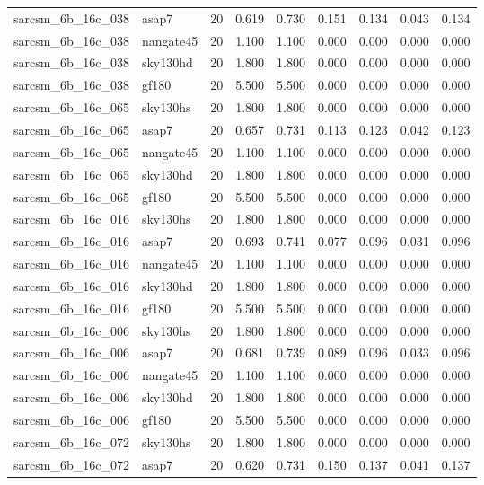 \begin{tabular}{llrrrrrrr}
sarcsm\_6b\_16c\_038 & asap7 & 20 & 0.619 & 0.730 & 0.151 & 0.134 & 0.043 & 0.134 \\
sarcsm\_6b\_16c\_038 & nangate45 & 20 & 1.100 & 1.100 & 0.000 & 0.000 & 0.000 & 0.000 \\
sarcsm\_6b\_16c\_038 & sky130hd & 20 & 1.800 & 1.800 & 0.000 & 0.000 & 0.000 & 0.000 \\
sarcsm\_6b\_16c\_038 & gf180 & 20 & 5.500 & 5.500 & 0.000 & 0.000 & 0.000 & 0.000 \\
sarcsm\_6b\_16c\_065 & sky130hs & 20 & 1.800 & 1.800 & 0.000 & 0.000 & 0.000 & 0.000 \\
sarcsm\_6b\_16c\_065 & asap7 & 20 & 0.657 & 0.731 & 0.113 & 0.123 & 0.042 & 0.123 \\
sarcsm\_6b\_16c\_065 & nangate45 & 20 & 1.100 & 1.100 & 0.000 & 0.000 & 0.000 & 0.000 \\
sarcsm\_6b\_16c\_065 & sky130hd & 20 & 1.800 & 1.800 & 0.000 & 0.000 & 0.000 & 0.000 \\
sarcsm\_6b\_16c\_065 & gf180 & 20 & 5.500 & 5.500 & 0.000 & 0.000 & 0.000 & 0.000 \\
sarcsm\_6b\_16c\_016 & sky130hs & 20 & 1.800 & 1.800 & 0.000 & 0.000 & 0.000 & 0.000 \\
sarcsm\_6b\_16c\_016 & asap7 & 20 & 0.693 & 0.741 & 0.077 & 0.096 & 0.031 & 0.096 \\
sarcsm\_6b\_16c\_016 & nangate45 & 20 & 1.100 & 1.100 & 0.000 & 0.000 & 0.000 & 0.000 \\
sarcsm\_6b\_16c\_016 & sky130hd & 20 & 1.800 & 1.800 & 0.000 & 0.000 & 0.000 & 0.000 \\
sarcsm\_6b\_16c\_016 & gf180 & 20 & 5.500 & 5.500 & 0.000 & 0.000 & 0.000 & 0.000 \\
sarcsm\_6b\_16c\_006 & sky130hs & 20 & 1.800 & 1.800 & 0.000 & 0.000 & 0.000 & 0.000 \\
sarcsm\_6b\_16c\_006 & asap7 & 20 & 0.681 & 0.739 & 0.089 & 0.096 & 0.033 & 0.096 \\
sarcsm\_6b\_16c\_006 & nangate45 & 20 & 1.100 & 1.100 & 0.000 & 0.000 & 0.000 & 0.000 \\
sarcsm\_6b\_16c\_006 & sky130hd & 20 & 1.800 & 1.800 & 0.000 & 0.000 & 0.000 & 0.000 \\
sarcsm\_6b\_16c\_006 & gf180 & 20 & 5.500 & 5.500 & 0.000 & 0.000 & 0.000 & 0.000 \\
sarcsm\_6b\_16c\_072 & sky130hs & 20 & 1.800 & 1.800 & 0.000 & 0.000 & 0.000 & 0.000 \\
sarcsm\_6b\_16c\_072 & asap7 & 20 & 0.620 & 0.731 & 0.150 & 0.137 & 0.041 & 0.137 \\

\end{tabular}
